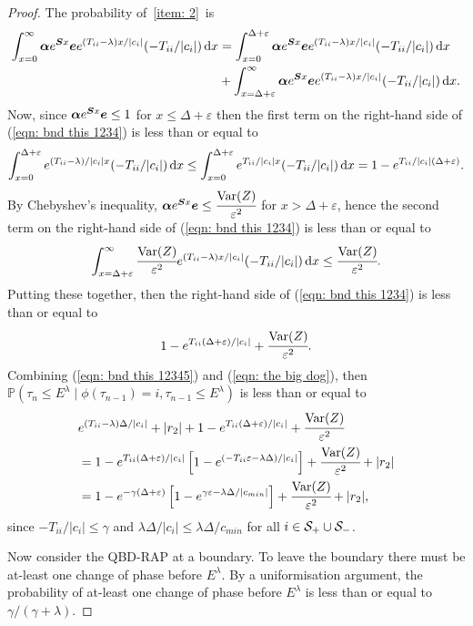 \begin{proof}
	The probability of~\ref{item: 2}~is 
	\begin{align}
		\nonumber\int_{x=0}^\infty \boldsymbol \alpha e^{\boldsymbol{S}x}\boldsymbol e e^{(T_{ii}-\lambda)x/|c_i|}(-T_{ii}/|c_i|)\, \mathrm{d} x 
		&= \int_{x=0}^{\Delta+\varepsilon} \boldsymbol \alpha e^{\boldsymbol{S}x}\boldsymbol ee^{(T_{ii}-\lambda)x/|c_i|}(-T_{ii}/|c_i|)\, \mathrm{d} x 
		\\&{}+\int_{x=\Delta+\varepsilon}^\infty \boldsymbol \alpha e^{\boldsymbol{S}x}\boldsymbol e e^{(T_{ii}-\lambda)x/|c_i|}(-T_{ii}/|c_i|)\, \mathrm{d} x.\label{eqn: bnd this 1234}
	\end{align}
	Now, since \(\boldsymbol \alpha e^{\boldsymbol{S}x}\boldsymbol e\leq 1\) for \(x\leq \Delta+\varepsilon\) then the first term on the right-hand side of (\ref{eqn: bnd this 1234}) is less than or equal to 
	\[\displaystyle \int_{x=0}^{\Delta+\varepsilon} e^{(T_{ii}-\lambda)/|c_i|x}(-T_{ii}/|c_i|)\, \mathrm{d} x \leq \int_{x=0}^{\Delta+\varepsilon} e^{T_{ii}/|c_i|x}(-T_{ii}/|c_i|)\, \mathrm{d} x = 1-e^{T_{ii}/|c_i|(\Delta+\varepsilon)}.\]
	By Chebyshev's inequality, \(\boldsymbol \alpha e^{\boldsymbol{S}x}\boldsymbol e\leq \cfrac{\mathrm{Var}(Z)}{\varepsilon^2}\) for \(x> \Delta+\varepsilon\), hence the second term on the right-hand side of (\ref{eqn: bnd this 1234}) is less than or equal to 
	\[\displaystyle \int_{x=\Delta+\varepsilon}^\infty \cfrac{\mathrm{Var}(Z)}{\varepsilon^2} e^{(T_{ii}-\lambda)x/|c_i|}(-T_{ii}/|c_i|)\, \mathrm{d} x \leq  \cfrac{\mathrm{Var}(Z)}{\varepsilon^2}.\]
	Putting these together, then the right-hand side of (\ref{eqn: bnd this 1234}) is less than or equal to
	\begin{align}
		1-e^{T_{ii}(\Delta+\varepsilon)/|c_i|} + \cfrac{\mathrm{Var}(Z)}{\varepsilon^2}.\label{eqn: the big dog}
	\end{align}	
	Combining (\ref{eqn: bnd this 12345}) and (\ref{eqn: the big dog}), then \(\mathbb P(\tau_n\leq E^\lambda  \mid \phi(\tau_{n-1})=i , \tau_{n-1}\leq  E^\lambda)\) is less than or equal to 
	\begin{align}
		&e^{(T_{ii}-\lambda)\Delta/|c_i|} + |r_2| + 1-e^{T_{ii}(\Delta+\varepsilon)/|c_i|} + \cfrac{\mathrm{Var}(Z)}{\varepsilon^2}\nonumber
		\\&= 1-e^{T_{ii}(\Delta+\varepsilon)/|c_i|}\left[1-e^{(-T_{ii}\varepsilon-\lambda \Delta)/|c_i|}\right] + \cfrac{\mathrm{Var}(Z)}{\varepsilon^2} + |r_2| \nonumber 
		\\&= 1-e^{-\gamma(\Delta+\varepsilon)}\left[1-e^{\gamma\varepsilon-\lambda \Delta/|c_{min}|}\right] + \cfrac{\mathrm{Var}(Z)}{\varepsilon^2} + |r_2|,
	\end{align}
	since \(-T_{ii}/|c_i|\leq \gamma\) and \(\lambda \Delta/|c_i| \leq \lambda \Delta/c_{min}\) for all \(i\in\mathcal S_+\cup \mathcal{S}_-\). 
	
	Now consider the QBD-RAP at a boundary. To leave the boundary there must be at-least one change of phase before \(E^\lambda\). By a uniformisation argument, the probability of at-least one change of phase before \(E^\lambda\) is less than or equal to \(\gamma/(\gamma+\lambda)\). 
\end{proof}

